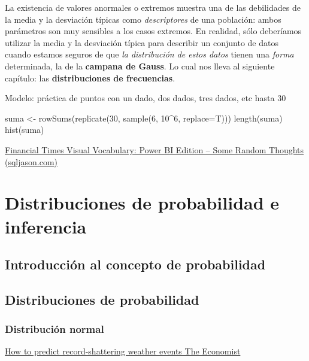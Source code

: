 \documentclass[
  letterpaper,
  DIV=11,
  numbers=noendperiod,
  oneside]{scrreprt}
\begin{document}
La existencia de valores anormales o extremos muestra una de las
debilidades de la media y la desviación típicas como \emph{descriptores}
de una población: ambos parámetros son muy sensibles a los casos
extremos. En realidad, sólo deberíamos utilizar la media y la desviación
típica para describir un conjunto de datos cuando estamos seguros de que
\emph{la distribución de estos datos} tienen una \emph{forma}
determinada, la de la \textbf{campana de Gauss}. Lo cual nos lleva al
siguiente capítulo: las \textbf{distribuciones de frecuencias}.

Modelo: práctica de puntos con un dado, dos dados, tres dados, etc hasta
30

suma \textless- rowSums(replicate(30, sample(6, 10\^{}6, replace=T)))
length(suma) hist(suma)

\href{http://sqljason.com/2018/12/financial-times-visual-vocabulary-power-bi-edition.html}{Financial
Times Visual Vocabulary: Power BI Edition -- Some Random Thoughts
(sqljason.com)}


\hypertarget{distribuciones-de-probabilidad-e-inferencia}{%
\chapter{Distribuciones de probabilidad e
inferencia}\label{distribuciones-de-probabilidad-e-inferencia}}

\hypertarget{introducciuxf3n-al-concepto-de-probabilidad}{%
\section{Introducción al concepto de
probabilidad}\label{introducciuxf3n-al-concepto-de-probabilidad}}

\hypertarget{distribuciones-de-probabilidad}{%
\section{Distribuciones de
probabilidad}\label{distribuciones-de-probabilidad}}

\hypertarget{distribuciuxf3n-normal}{%
\subsection{Distribución normal}\label{distribuciuxf3n-normal}}

\href{https://www.economist.com/science-and-technology/2023/02/08/extreme-weather-events-are-getting-more-frequent}{How
to predict record-shattering weather events \textbar{} The Economist}
\end{document}

